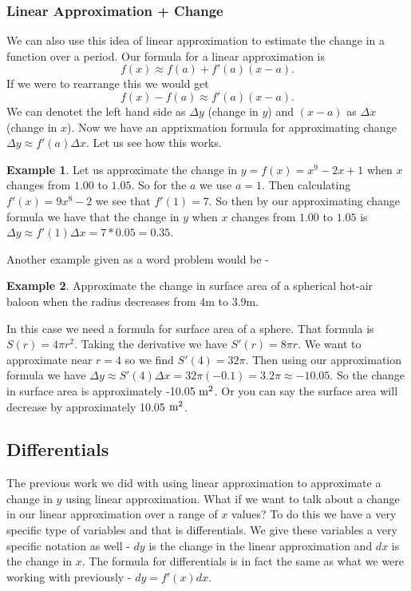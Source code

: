 \documentclass[12pt,reqno]{article}
\theoremstyle{definition}
\newtheorem*{Example}{Example}
\begin{document}
\subsubsection{Linear Approximation + Change}

We can also use this idea of linear approximation to estimate the change in a function over a period. Our formula for a linear approximation is $$f(x) \approx f(a) + f'(a)(x - a).$$ If we were to rearrange this we would get $$f(x) - f(a) \approx f'(a) (x - a).$$ We can denotet the left hand side as $\Delta y$ (change in $y$) and $(x - a)$ as $\Delta x$ (change in $x$). Now we have an apprixmation formula for approximating change $\Delta y \approx f'(a) \Delta x$. Let us see how this works. 
\begin{Example}
	Let us approximate the change in $y = f(x) = x^9 - 2x + 1$ when $x$ changes from $1.00$ to $1.05$. So for the $a$ we use $a = 1$. Then calculating $f'(x) = 9x^8 - 2$ we see that $f'(1) = 7$. So then by our approximating change formula we have that the change in $y$ when $x$ changes from $1.00$ to $1.05$ is $\Delta y \approx f'(1) \Delta x = 7*0.05 = 0.35$. 
\end{Example}

Another example given as a word problem would be  - 
\begin{Example}
	Approximate the change in surface area of a spherical hot-air baloon when the radius decreases from $4$m to $3.9$m. 
	
	In this case we need a formula for surface area of a sphere. That formula is $S(r) = 4 \pi r^2$. Taking the derivative we have $S'(r) = 8 \pi r$. We want to approximate near $r = 4$ so we find $S'(4) = 32 \pi$. Then using our approximation formula we have $\Delta y \approx S'(4) \Delta x = 32 \pi (-0.1) = 3.2\pi \approx -10.05$. So the change in surface area is approximately -10.05 $\textnormal{m}^2$. Or you can say the surface area will decrease by approximately 10.05 $\textnormal{m}^2$. 
\end{Example}

\subsection{Differentials}

The previous work we did with using linear approximation to approximate a change in $y$ using linear approximation. What if we want to talk about a change in our linear approximation over a range of $x$ values? To do this we have a very specific type of variables and that is differentials. We give these variables a very specific notation as well - $dy$ is the change in the linear approximation and $dx$ is the change in $x$. The formula for differentials is in fact the same as what we were working with previously - $dy = f'(x) dx$. 
\end{document}
